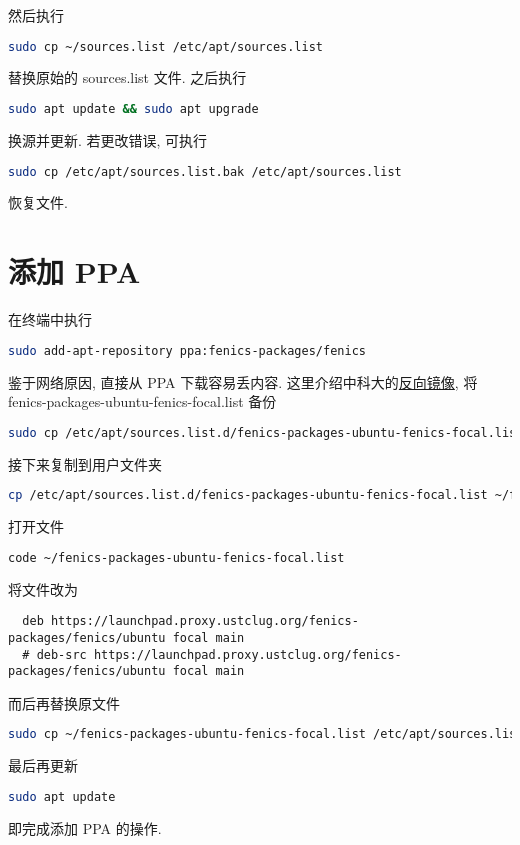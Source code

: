 \documentclass[fontset=founder]{ctexart}
\begin{document}
然后执行
\begin{lstlisting}[language = bash]
  sudo cp ~/sources.list /etc/apt/sources.list
\end{lstlisting}
替换原始的 \textsf{sources.list} 文件.
之后执行
\begin{lstlisting}[language=bash]
  sudo apt update && sudo apt upgrade
\end{lstlisting}
换源并更新.
若更改错误,
可执行
\begin{lstlisting}[language=bash]
  sudo cp /etc/apt/sources.list.bak /etc/apt/sources.list
\end{lstlisting}
恢复文件.

\section{添加 PPA}

在终端中执行
\begin{lstlisting}[language = bash]
  sudo add-apt-repository ppa:fenics-packages/fenics
\end{lstlisting}
鉴于网络原因,
直接从 PPA 下载容易丢内容.
这里介绍中科大的\href{https://lug.ustc.edu.cn/wiki/mirrors/help/revproxy/}{反向镜像},
将 \textsf{fenics-packages-ubuntu-fenics-focal.list} 备份
\begin{lstlisting}[language = bash]
  sudo cp /etc/apt/sources.list.d/fenics-packages-ubuntu-fenics-focal.list /etc/apt/sources.list.d/fenics-packages-ubuntu-fenics-focal.list.bak
\end{lstlisting}
接下来复制到用户文件夹
\begin{lstlisting}[language = bash]
  cp /etc/apt/sources.list.d/fenics-packages-ubuntu-fenics-focal.list ~/fenics-packages-ubuntu-fenics-focal.list
\end{lstlisting}
打开文件
\begin{lstlisting}[language = bash]
  code ~/fenics-packages-ubuntu-fenics-focal.list
\end{lstlisting}
将文件改为
\begin{lstlisting}
  deb https://launchpad.proxy.ustclug.org/fenics-packages/fenics/ubuntu focal main
  # deb-src https://launchpad.proxy.ustclug.org/fenics-packages/fenics/ubuntu focal main
\end{lstlisting}
而后再替换原文件
\begin{lstlisting}[language = bash]
  sudo cp ~/fenics-packages-ubuntu-fenics-focal.list /etc/apt/sources.list.d/fenics-packages-ubuntu-fenics-focal.list
\end{lstlisting}
最后再更新
\begin{lstlisting}[language = bash]
  sudo apt update
\end{lstlisting}
即完成添加 PPA 的操作.
\end{document}

